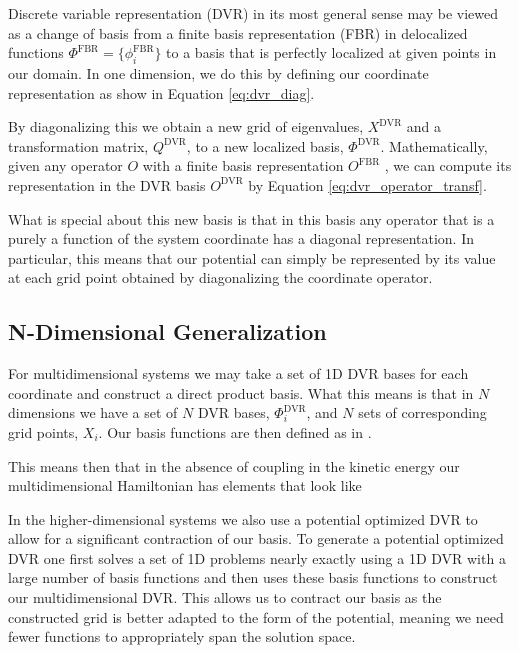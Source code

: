 % 
% 

Discrete variable representation (DVR) in its most general sense may be viewed as a change of basis from a finite basis representation (FBR) in delocalized functions $ \Phi^{\mathrm{FBR}}=\{\phi_i^{\mathrm{FBR}} \} $ to a basis that is perfectly localized at given points in our domain. In one dimension, we do this by defining our coordinate representation as show in Equation \ref{eq:dvr_diag}.


By diagonalizing this we obtain a new grid of eigenvalues, $ X^{ \mathrm{DVR}} $ and a transformation matrix, $ Q^{ \mathrm{DVR} } $, to a new localized basis, $\Phi^{ \mathrm{DVR} } $. Mathematically, given any operator $O$ with a finite basis representation $O^{\mathrm{FBR}}$ , we can compute its representation in the DVR basis $O^{ \mathrm{DVR} }$ by Equation \ref{eq:dvr_operator_transf}.


What is special about this new basis is that in this basis any operator that is a purely a function of the system coordinate has a diagonal representation. In particular, this means that our potential can simply be represented by its value at each grid point obtained by diagonalizing the coordinate operator.

\subsection{N-Dimensional Generalization}
For multidimensional systems we may take a set of 1D DVR bases for each coordinate and construct a direct product basis. What this means is that in $N$ dimensions we have a set of $N$ DVR bases, ${\Phi^{\mathrm{DVR}}_i}$, and $N$ sets of corresponding grid points, ${X_i}$. Our basis functions are then defined as in .


This means then that in the absence of coupling in the kinetic energy our multidimensional Hamiltonian has elements that look like


In the higher-dimensional systems we also use a potential optimized DVR to allow for a significant contraction of our basis. To generate a potential optimized DVR one first solves a set of 1D problems nearly exactly using a 1D DVR with a large number of basis functions and then uses these basis functions to construct our multidimensional DVR. This allows us to contract our basis as the constructed grid is better adapted to the form of the potential, meaning we need fewer functions to appropriately span the solution space. \EDIT

